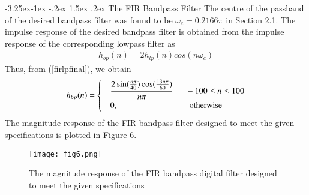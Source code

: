 \documentclass[article]{IEEEtran}
\makeatletter
\theoremstyle{remark}
\numberwithin{equation}{subsection}
\renewcommand\subsection{\@startsection{subsection}{2}{\z@}%
    {-3.25ex\@plus -1ex \@minus -.2ex}%
    {1.5ex \@plus .2ex}%
    {\normalfont\large\bfseries}}
\makeatother
\begin{document}
\subsection{The FIR Bandpass Filter}
The centre of the passband of the desired bandpass filter was found to be $\omega_c = 0.2166\pi$ in Section
2.1.  The impulse response of the desired bandpass filter is obtained from the impulse response of the
corresponding lowpass filter as
\begin{align}
h_{bp}(n) = 2h_{lp}(n)cos(n\omega_c)
\end{align}
Thus, from (\ref{firlpfinal}), we obtain
\begin{align}
h_{bp}(n) =
\begin{cases}
\label{firbpfinal}
& \dfrac{2\sin(\frac{n\pi}{40}) \cos(\frac{13n\pi}{60})}{n\pi} \indent -100 \leq n \leq 100 \nonumber \\
& 0, \hspace{3cm} \mbox{otherwise}
\end{cases}
\end{align}
The magnitude response of the FIR bandpass filter designed to meet the given specifications is plotted in Figure 6.
\begin{figure}[H]
\label{fig6}
\texttt{[image: fig6.png]}
\caption{The magnitude response of the FIR bandpass digital filter designed to meet the given specifications} 
\end{figure}
\end{document}
